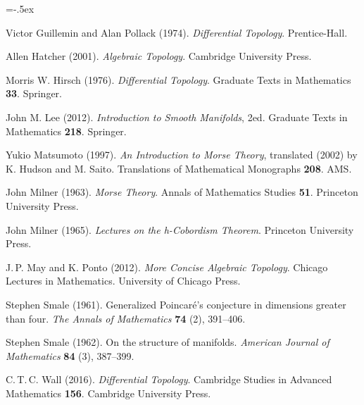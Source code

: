 \small
\begin{thebibliography}{MMMM}
    \itemsep=-.5ex
    
     Victor Guillemin and Alan Pollack (1974).
    \emph{Differential Topology}.
    Prentice-Hall.

     Allen Hatcher (2001).
    \emph{Algebraic Topology}.
    Cambridge University Press.

     Morris W. Hirsch (1976).
    \emph{Differential Topology}.
    Graduate Texts in Mathematics \textbf{33}. Springer.

     John M. Lee (2012).
    \emph{Introduction to Smooth Manifolds}, 2ed.
    Graduate Texts in Mathematics \textbf{218}. Springer.

     Yukio Matsumoto (1997).
    \emph{An Introduction to Morse Theory},
    translated (2002) by K. Hudson and M. Saito.
    Translations of Mathematical Monographs \textbf{208}.
    AMS.

     John Milner (1963).
    \emph{Morse Theory}.
    Annals of Mathematics Studies \textbf{51}.
    Princeton University Press.

     John Milner (1965).
    \emph{Lectures on the h-Cobordism Theorem}.
    Princeton University Press.

     J.\,P. May and K. Ponto (2012).
    \emph{More Concise Algebraic Topology}.
    Chicago Lectures in Mathematics.
    University of Chicago Press.

     Stephen Smale (1961).
    Generalized Poincar\'e's conjecture in dimensions greater than four.
    \emph{The Annals of Mathematics} \textbf{74} (2), 391--406.

     Stephen Smale (1962).
    On the structure of manifolds.
    \emph{American Journal of Mathematics} \textbf{84} (3), 387--399.

     C.\,T.\,C. Wall (2016).
    \emph{Differential Topology}.
    Cambridge Studies in Advanced Mathematics \textbf{156}.
    Cambridge University Press.
\end{thebibliography}
